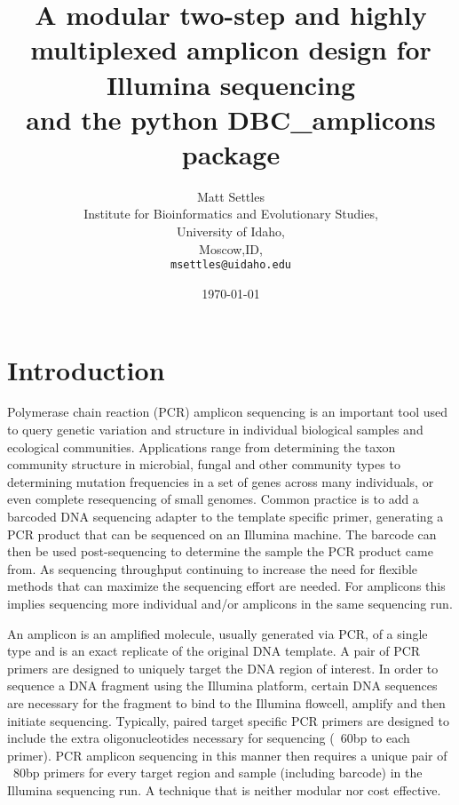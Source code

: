 \documentclass[10pt,oneside]{memoir}
\begin{document}
\frontmatter
\title{\textbf{A modular two-step and highly multiplexed amplicon design for Illumina sequencing}\\{\Large and the python DBC\_amplicons package}}
\author{Matt Settles\\
  Institute for Bioinformatics and Evolutionary Studies,\\
  University of Idaho,\\
  Moscow,ID,\\
  \texttt{msettles@uidaho.edu}}
\date{\today}
\maketitle

\clearpage

\section*{Introduction}
Polymerase chain reaction (PCR) amplicon sequencing is an important tool used to query genetic variation and structure in individual biological samples and ecological communities. Applications range from determining the taxon community structure in microbial, fungal and other community types to determining mutation frequencies in a set of genes across many individuals, or even complete resequencing of small genomes. Common practice is to add a barcoded DNA sequencing adapter to the template specific primer, generating a PCR product that can be sequenced on an Illumina machine. The barcode can then be used post-sequencing to determine the sample the PCR product came from. As sequencing throughput continuing to increase the need for flexible methods that can maximize the sequencing effort are needed. For amplicons this implies sequencing more individual and/or amplicons in the same sequencing run.

An amplicon is an amplified molecule, usually generated via PCR, of a single type and is an exact replicate of the original DNA template. A pair of PCR primers are designed to uniquely target the DNA region of interest. In order to sequence a DNA fragment using the Illumina platform, certain DNA sequences are necessary for the fragment to bind to the Illumina flowcell, amplify and then initiate sequencing. Typically, paired target specific PCR primers are designed to include the extra oligonucleotides necessary for sequencing (~60bp to each primer). PCR amplicon sequencing in this manner then requires a unique pair of ~80bp primers for every target region and sample (including barcode) in the Illumina sequencing run. A technique that is neither modular nor cost effective.
\end{document}
